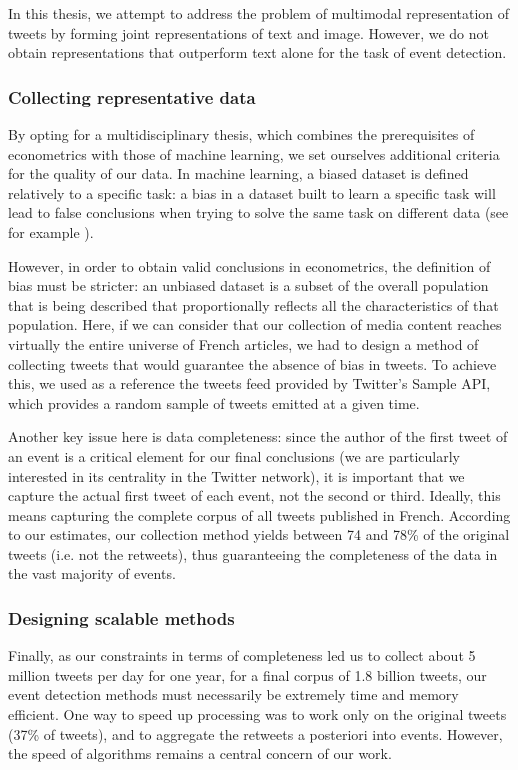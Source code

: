 In this thesis, we attempt to address the problem of multimodal representation of tweets by forming joint representations of text and image. However, we do not obtain representations that outperform text alone for the task of event detection.

\subsubsection{Collecting representative data}

By opting for a multidisciplinary thesis, which combines the prerequisites of econometrics with those of machine learning, we set ourselves additional criteria for the quality of our data. In machine learning, a biased dataset is defined relatively to a specific task: a bias in a dataset built to learn a specific task will lead to false conclusions when trying to solve the same task on different data (see for example \citep{tommasi2017deeper}).

However, in order to obtain valid conclusions in econometrics, the definition of bias must be stricter: an unbiased dataset is a subset of the overall population that is being described that proportionally reflects all the characteristics of that population. Here, if we can consider that our collection of media content reaches virtually the entire universe of French articles, we had to design a method of collecting tweets that would guarantee the absence of bias in tweets. To achieve this, we used as a reference the tweets feed provided by Twitter's Sample API, which provides a random sample of tweets emitted at a given time.

Another key issue here is data completeness: since the author of the first tweet of an event is a critical element for our final conclusions (we are particularly interested in its centrality in the Twitter network), it is important that we capture the actual first tweet of each event, not the second or third. Ideally, this means capturing the complete corpus of all tweets published in French. According to our estimates, our collection method yields between 74 and 78\% of the original tweets (i.e. not the retweets), thus guaranteeing the completeness of the data in the vast majority of events.

\subsubsection{Designing scalable methods}
Finally, as our constraints in terms of completeness led us to collect about 5 million tweets per day for one year, for a final corpus of 1.8 billion tweets, our event detection methods must necessarily be extremely time and memory efficient. One way to speed up processing was to work only on the original tweets (37\% of tweets), and to aggregate the retweets a posteriori into events. However, the speed of algorithms remains a central concern of our work. 

